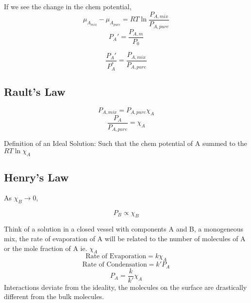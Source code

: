 \documentclass{article}
\theoremstyle{definition}
\begin{document}
If we see the change in the chem potential,
\[
\mu_{A_{mix}} - \mu_{A_{pure}} = RT\ln{\frac{P_{A, mix}}{P_{A,pure}}}
\]
\[
P_A' = \frac{P_{A,m}}{P_0}
\]

\[
\frac{P_A'}{P_A^*} = \frac{P_{A,mix}}{P_{A, pure}}
\]

\subsection{Rault's Law}

\begin{center}
    

\end{center}
\[
P_{A, mix} = P_{A, pure}\chi_A
\]
\[
\frac{P_A}{P_{A, pure}} = \chi_A
\]


Definition of an Ideal Solution: Such that the chem potential of A summed to the $RT\ln{\chi_A}$

\subsection{Henry's Law}
As $\chi_B \rightarrow0$,

\[
P_B \propto \chi_B
\]

Think of a solution in a closed vessel with components A and B, a monogeneous mix, the rate of evaporation of A will be related to the number of molecules of A or the mole fraction of A  ie. $\chi_A$
\[
\text{Rate of Evaporation} = k\chi_A
\]
\[
\text{Rate of Condensation} = k'P_A
\]
\[
P_A = \frac{k}{k'}\chi_A
\]
Interactions deviate from the ideality, the molecules on the surface are drastically different from the bulk molecules.
\end{document}
